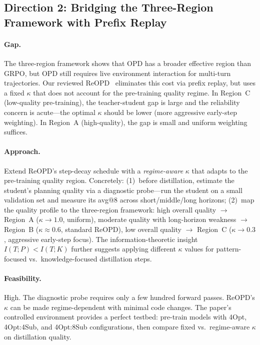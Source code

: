 \documentclass[11pt,a4paper]{article}
\begin{document}
\subsection{Direction 2: Bridging the Three-Region Framework with Prefix Replay}

\paragraph{Gap.}
The three-region framework shows that OPD has a broader effective region than GRPO, but OPD still requires live environment interaction for multi-turn trajectories. Our reviewed ReOPD~\cite{liao2026multiturn} eliminates this cost via prefix replay, but uses a fixed $\kappa$ that does not account for the pre-training quality regime. In Region~C (low-quality pre-training), the teacher-student gap is large and the reliability concern is acute---the optimal $\kappa$ should be lower (more aggressive early-step weighting). In Region~A (high-quality), the gap is small and uniform weighting suffices.

\paragraph{Approach.}
Extend ReOPD's step-decay schedule with a \emph{regime-aware} $\kappa$ that adapts to the pre-training quality region. Concretely: (1)~before distillation, estimate the student's planning quality via a diagnostic probe---run the student on a small validation set and measure its avg@8 across short/middle/long horizons; (2)~map the quality profile to the three-region framework: high overall quality $\to$ Region~A ($\kappa \to 1.0$, uniform), moderate quality with long-horizon weakness $\to$ Region~B ($\kappa \approx 0.6$, standard ReOPD), low overall quality $\to$ Region~C ($\kappa \to 0.3$, aggressive early-step focus). The information-theoretic insight $I(T;P) < I(T;K)$ further suggests applying different $\kappa$ values for pattern-focused vs.\ knowledge-focused distillation steps.

\paragraph{Feasibility.}
High. The diagnostic probe requires only a few hundred forward passes. ReOPD's $\kappa$ can be made regime-dependent with minimal code changes. The paper's controlled environment provides a perfect testbed: pre-train models with 4Opt, 4Opt:4Sub, and 4Opt:8Sub configurations, then compare fixed vs.\ regime-aware $\kappa$ on distillation quality.
\end{document}
